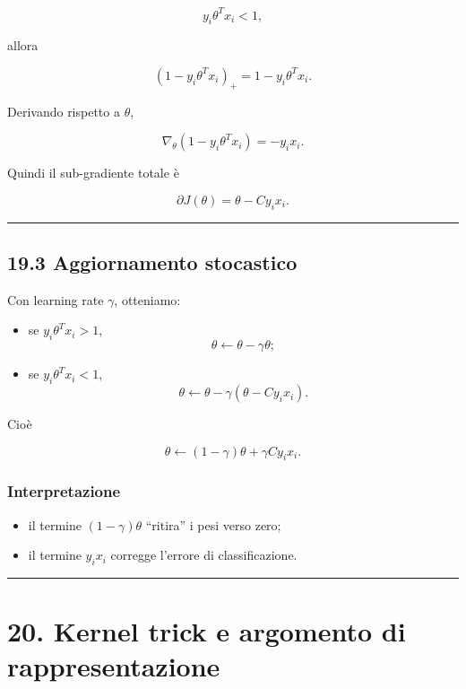 \documentclass{article}
\providecommand{\tightlist}{%
  \setlength{\itemsep}{0pt}\setlength{\parskip}{0pt}}
\begin{document}
\[
y_i\theta^Tx_i < 1,
\]

allora

\[
(1-y_i\theta^Tx_i)_+ = 1-y_i\theta^Tx_i.
\]

Derivando rispetto a \(\theta\),

\[
\nabla_\theta(1-y_i\theta^Tx_i) = -y_i x_i.
\]

Quindi il sub-gradiente totale è

\[
\partial J(\theta)=\theta - C y_i x_i.
\]

\begin{center}\rule{0.5\linewidth}{0.5pt}\end{center}

\subsection{19.3 Aggiornamento
stocastico}\label{aggiornamento-stocastico}

Con learning rate \(\gamma\), otteniamo:

\begin{itemize}
\item
  se \(y_i\theta^Tx_i>1\), \[
  \theta \leftarrow \theta - \gamma \theta;
  \]
\item
  se \(y_i\theta^Tx_i<1\), \[
  \theta \leftarrow \theta - \gamma(\theta - C y_i x_i).
  \]
\end{itemize}

Cioè

\[
\theta \leftarrow (1-\gamma)\theta + \gamma C y_i x_i.
\]

\subsubsection{Interpretazione}\label{interpretazione-6}

\begin{itemize}
\tightlist
\item
  il termine \((1-\gamma)\theta\) ``ritira'' i pesi verso zero;
\item
  il termine \(y_i x_i\) corregge l'errore di classificazione.
\end{itemize}

\begin{center}\rule{0.5\linewidth}{0.5pt}\end{center}

\section{20. Kernel trick e argomento di
rappresentazione}\label{kernel-trick-e-argomento-di-rappresentazione}
\end{document}
